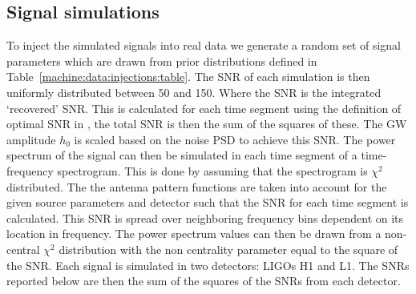 \subsection{\label{machine:data:injections} Signal simulations}

%
To inject the simulated signals into real data we generate a random set of signal
parameters which are drawn from prior distributions defined in
Table~\ref{machine:data:injections:table}. The \ac{SNR} of each simulation is then uniformly distributed between 50 and 150. Where the \ac{SNR} is the integrated `recovered' \ac{SNR}. This is calculated for each time segment using the definition of optimal \ac{SNR} in \cite{prix2007SearchContinuous}, the total \ac{SNR} is then the sum of the squares of these.
The \ac{GW} amplitude $h_{0}$ is scaled based on the noise \ac{PSD} to achieve this \ac{SNR}. 
The power spectrum of the signal can then be simulated in each time segment of a time-frequency spectrogram. This is done by assuming that the spectrogram is $\chi^2$ distributed.
The the antenna pattern functions are taken into account for the given source parameters and detector such that the \ac{SNR} for each time segment is calculated.
This \ac{SNR} is spread over neighboring frequency bins dependent on its location in frequency.
The power spectrum values can then be drawn from a non-central $\chi^2$ distribution with the non centrality parameter equal to the square of the \ac{SNR}.
Each signal is simulated in two detectors: \acp{LIGO} H1 and L1.
The \acp{SNR} reported below are then the sum of the squares of the \acp{SNR} from each detector.


%
\begin{table}
	\caption{\label{machine:data:injections:table} Table shows the upper and lower limits
		over which each signal parameter was randomized. The parameters $\alpha,\sin{\left(\delta \right)},f,\;\log{\left( \dot{f} \right)},\; \cos{\left(\iota
			\right)},\; \phi_0,\; \psi$ were sampled
		uniformly in the ranges specified in the table. The frequencies $f_{\rm l}$ and $f_{\rm u}$
		refer to the lower and upper frequency of the band that each signal is injected
		into. Excluding the distribution of frequencies $f$, all the injections parameters are sampled from the same distributions as the S6
		\ac{MDC}~\cite{walsh2016ComparisonMethods}.}
\end{table}

